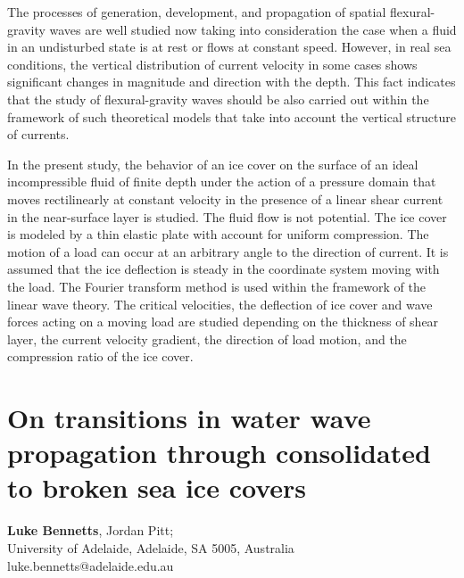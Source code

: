 \documentclass[9pt,a4paper,oneside]{book}
\numberwithin{equation}{section}
\begin{document}
The processes of generation, development, and propagation of spatial flexural-gravity waves are well studied now taking into consideration the case when a fluid in an undisturbed state is at rest or flows at constant speed. However, in real sea conditions, the vertical distribution of current velocity in some cases shows significant changes in magnitude and direction with the depth. This fact indicates that the study of flexural-gravity waves should be also carried out within the framework of such theoretical models that take into account the vertical structure of currents.
 
In the present study, the behavior of an ice cover on the surface of an ideal incompressible fluid of finite depth under the action of a pressure domain that moves rectilinearly at constant velocity in the presence of a linear shear current in the near-surface layer is studied. The fluid flow is not potential. The ice cover is modeled by a thin elastic plate with account for uniform compression. The motion of a load can occur at an arbitrary angle to the direction of current. It is assumed that the ice deflection is steady in the coordinate system moving with the load. The Fourier transform method is used within the framework of the linear wave theory. The critical velocities, the deflection of ice cover and wave forces acting on a moving load are studied depending on the thickness of shear layer, the current velocity gradient, the direction of load motion, and the compression ratio of the ice cover.

\section*{On transitions in water wave propagation through consolidated to broken sea ice covers}
 \label{abs:4}
  {\bf Luke Bennetts}, Jordan Pitt;\\
University of Adelaide, Adelaide, SA 5005, Australia\\
luke.bennetts@adelaide.edu.au\\
\end{document}
